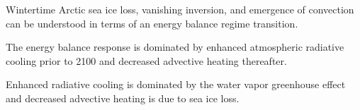 \documentclass[draft]{agujournal2019}
\begin{document}




\begin{keypoints}
\item Wintertime Arctic sea ice loss, vanishing inversion, and emergence of convection can be understood in terms of an energy balance regime transition.
\item The energy balance response is dominated by enhanced atmospheric radiative cooling prior to 2100 and decreased advective heating thereafter.
\item Enhanced radiative cooling is dominated by the water vapor greenhouse effect and decreased advective heating is due to sea ice loss.
\end{keypoints}

%
%

%
%
\end{document}

